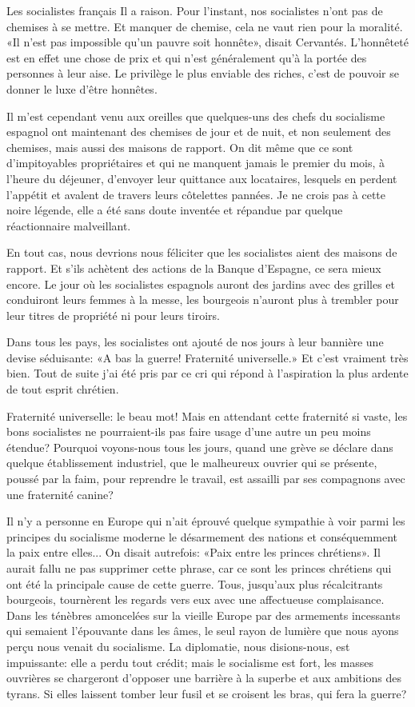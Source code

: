 \begin{chapter}{Les socialistes français}
Il a raison. Pour l'instant, nos socialistes n'ont pas de chemises à se
mettre. Et manquer de chemise, cela ne vaut rien pour la moralité. «Il
n'est pas impossible qu'un pauvre soit honnête», disait Cervantés.
L'honnêteté est en effet une chose de prix et qui n'est généralement
qu'à la portée des personnes à leur aise. Le privilège le plus enviable
des riches, c'est de pouvoir se donner le luxe d'être honnêtes.

Il m'est cependant venu aux oreilles que quelques-uns des chefs du
socialisme espagnol ont maintenant des chemises de jour et de nuit, et
non seulement des chemises, mais aussi des maisons de rapport. On dit
même que ce sont d'impitoyables propriétaires et qui ne manquent jamais
le premier du mois, à l'heure du déjeuner, d'envoyer leur quittance aux
locataires, lesquels en perdent l'appétit et avalent de travers leurs
côtelettes pannées. Je ne crois pas à cette noire légende, elle a été
sans doute inventée et répandue par quelque réactionnaire malveillant.

En tout cas, nous devrions nous féliciter que les socialistes aient des
maisons de rapport. Et s'ils achètent des actions de la Banque
d'Espagne, ce sera mieux encore. Le jour où les socialistes espagnols
auront des jardins avec des grilles et conduiront leurs femmes à la
messe, les bourgeois n'auront plus à trembler pour leur titres de
propriété ni pour leurs tiroirs.

Dans tous les pays, les socialistes ont ajouté de nos jours à leur
bannière une devise séduisante: «A bas la guerre! Fraternité
universelle.» Et c'est vraiment très bien. Tout de suite j'ai été pris
par ce cri qui répond à l'aspiration la plus ardente de tout esprit
chrétien.

Fraternité universelle: le beau mot! Mais en attendant cette fraternité
si vaste, les bons socialistes ne pourraient-ils pas faire usage d'une
autre un peu moins étendue? Pourquoi voyons-nous tous les jours, quand
une grève se déclare dans quelque établissement industriel, que le
malheureux ouvrier qui se présente, poussé par la faim, pour reprendre
le travail, est assailli par ses compagnons avec une fraternité canine?

Il n'y a personne en Europe qui n'ait éprouvé quelque sympathie à voir
parmi les principes du socialisme moderne le désarmement des nations et
conséquemment la paix entre elles... On disait autrefois: «Paix entre
les princes chrétiens». Il aurait fallu ne pas supprimer cette phrase,
car ce sont les princes chrétiens qui ont été la principale cause de
cette guerre. Tous, jusqu'aux plus récalcitrants bourgeois, tournèrent
les regards vers eux avec une affectueuse complaisance. Dans les
ténèbres amoncelées sur la vieille Europe par des armements incessants
qui semaient l'épouvante dans les âmes, le seul rayon de lumière que
nous ayons perçu nous venait du socialisme. La diplomatie, nous
disions-nous, est impuissante: elle a perdu tout crédit; mais le
socialisme est fort, les masses ouvrières se chargeront d'opposer une
barrière à la superbe et aux ambitions des tyrans. Si elles laissent
tomber leur fusil et se croisent les bras, qui fera la guerre?


\end{chapter}

